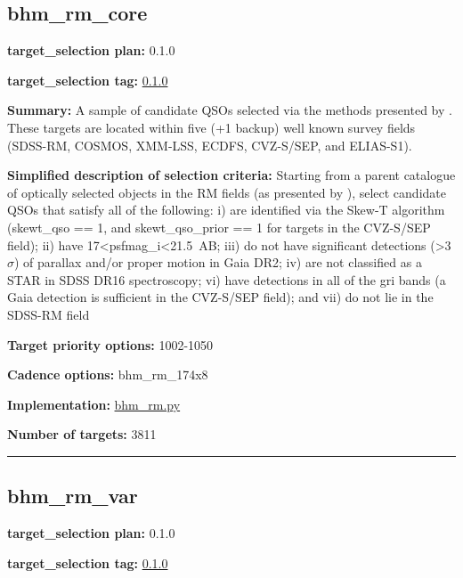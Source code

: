\hypertarget{bhm_rm_core_plan0.1.0}{%
\subsection{bhm\_rm\_core}\label{bhm_rm_core_plan0.1.0}}

\noindent\textbf{target\_selection plan:} 0.1.0

\noindent\textbf{target\_selection tag:}
\href{https://github.com/sdss/target_selection/tree/0.1.0/}{0.1.0}

\noindent\textbf{Summary:} A sample of candidate QSOs selected via the methods
presented by
\citet{Yang2022}. These targets are located within five (+1 backup) well
known survey fields (SDSS-RM, COSMOS, XMM-LSS, ECDFS, CVZ-S/SEP, and
ELIAS-S1).

\noindent\textbf{Simplified description of selection criteria:} Starting from a
parent catalogue of optically selected objects in the RM fields (as
presented by
\citealt{Yang2022}), select candidate QSOs that satisfy all of the
following: i) are identified via the Skew-T algorithm (skewt\_qso == 1,
and skewt\_qso\_prior == 1 for targets in the CVZ-S/SEP field); ii) have
17\textless psfmag\_i\textless21.5~AB; iii) do not have significant
detections (\textgreater3$\sigma$) of parallax and/or proper motion in Gaia
DR2; iv) are not classified as a STAR in SDSS DR16 spectroscopy; vi)
have detections in all of the gri bands (a Gaia detection is sufficient
in the CVZ-S/SEP field); and vii) do not lie in the SDSS-RM field


\noindent\textbf{Target priority options:} 1002-1050

\noindent\textbf{Cadence options:} bhm\_rm\_174x8

\noindent\textbf{Implementation:}
\href{https://github.com/sdss/target_selection/blob/0.1.0/python/target_selection/cartons/bhm_rm.py}{bhm\_rm.py}

\noindent\textbf{Number of targets:} 3811

\begin{center}\rule{0.5\linewidth}{0.5pt}\end{center}

\hypertarget{bhm_rm_var_plan0.1.0}{%
\subsection{bhm\_rm\_var}\label{bhm_rm_var_plan0.1.0}}

\noindent\textbf{target\_selection plan:} 0.1.0

\noindent\textbf{target\_selection tag:}
\href{https://github.com/sdss/target_selection/tree/0.1.0/}{0.1.0}

